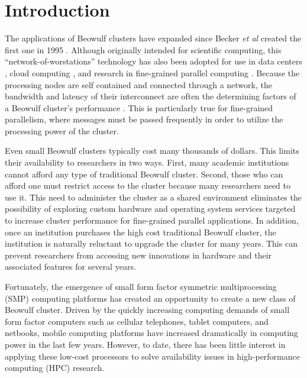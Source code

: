 \documentclass[11pt]{book}
\begin{document}
\clearpage
{}
\setcounter{page}{1}

\chapter{Introduction}
\label{introduction}

The applications of Beowulf clusters have expanded since Becker \emph{et al} created the
first one in 1995 \cite{becker-95}.  Although originally intended for scientific
computing, this ``network-of-worstations'' technology has also been adopted for use in
data centers \cite{liu-13}, cloud computing \cite{trivedi-11}, and research in
fine-grained parallel computing \cite{aad-03}.  Because the processing nodes are self
contained and connected through a network, the bandwidth and latency of their interconnect
are often the determining factors of a Beowulf cluster's performance
\cite{becker-95,lancaster-10}.  This is particularly true for fine-grained parallelism,
where messages must be passed frequently in order to utilize the processing power of the
cluster.

Even small Beowulf clusters typically cost many thousands of dollars.  This limits their
availability to researchers in two ways.  First, many academic institutions cannot afford
any type of traditional Beowulf cluster.  Second, those who can afford one must restrict
access to the cluster because many researchers need to use it.  This need to administer
the cluster as a shared environment eliminates the possibility of exploring custom
hardware and operating system services targeted to increase cluster performance for
fine-grained parallel applications.  In addition, once an institution purchases the high
cost traditional Beowulf cluster, the institution is naturally reluctant to upgrade the
cluster for many years.  This can prevent researchers from accessing new innovations in
hardware and their associated features for several years.

Fortunately, the emergence of small form factor symmetric multiprocessing (SMP) computing
platforms has created an opportunity to create a new class of Beowulf cluster.  Driven by
the quickly increasing computing demands of small form factor computers such as cellular
telephones, tablet computers, and netbooks, mobile computing platforms have increased
dramatically in computing power in the last few years.  However, to date, there has been
little interest in applying these low-cost processors to solve availability issues in
high-performance computing (HPC) research.
\end{document}
